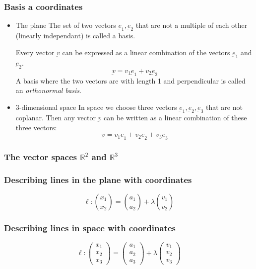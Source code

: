 \subsubsection{Basis a coordinates}
\begin{itemize}
    \item The plane \newline
    The set of two vectors $ \underbar{e}_1, \underbar{e}_2 $ that are not a multiple of each other (linearly independant) is called a basis.\par
    Every vector $ \underbar{v} $ can be expressed as a linear combination of the vectors $ \underbar{e}_1 $ and $ \underbar{e}_2 $.
    $$ \underbar{v} = v_1\underbar{e}_1 + v_2\underbar{e}_2 $$
    A basis where the two vectors are with length 1 and perpendicular is called an \emph{orthonormal basis}.
    \item 3-dimensional space \newline
    In space we choose three vectors $ \underbar{e}_1, \underbar{e}_2, \underbar{e}_3 $ that are not coplanar. Then any vector $ \underbar{v} $ can be written as a linear combination of these three vectors:
    $$ \underbar{v} = v_1\underbar{e}_1 + v_2\underbar{e}_2 + v_3\underbar{e}_3 $$

\end{itemize}

\subsubsection{The vector spaces $\mathbb{R}^2$ and $\mathbb{R}^3$}

\subsubsection{Describing lines in the plane with coordinates}
$$ \ell : \binom{x_1}{x_2} = \binom{a_1}{a_2} + \lambda \binom{v_1}{v_2} $$

\subsubsection{Describing lines in space with coordinates}
$$ \ell : \begin{pmatrix}
    x_1 \\ x_2 \\ x_3
\end{pmatrix} = \begin{pmatrix}
    a_1 \\ a_2 \\ a_3
\end{pmatrix} + \lambda \begin{pmatrix}
    v_1 \\ v_2 \\ v_3
\end{pmatrix}$$

